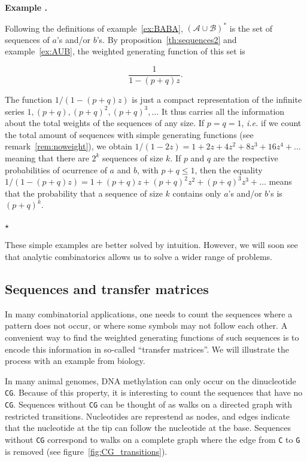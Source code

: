 \documentclass{article}
\newcounter{examplecounter}
\newenvironment{example}
{\small\vspace{0.5\baselineskip}
  \refstepcounter{examplecounter}%
  \noindent\textbf{Example \arabic{examplecounter}.}%
}{\vspace{-0.2\baselineskip}\begin{center}%
  $\star$\end{center}\vspace{0.5\baselineskip}}
\begin{document}
\begin{example}
\label{ex:AUB+}
Following the definitions of example~\ref{ex:BABA}, $(\mathcal{A} \cup
\mathcal{B})^*$ is the set of sequences of $a$'s and/or $b$'s. By
proposition~\ref{th:sequences2} and example~\ref{ex:AUB}, the weighted
generating function of this set is

\begin{equation*}
\frac{1}{1-(p+q)z}.
\end{equation*}

The function $1 / (1-(p+q)z)$ is just a compact representation of the
infinite series $1, (p+q), (p+q)^2, (p+q)^3, \ldots$ It thus carries all
the information about the total weights of the sequences of any size. If
$p = q = 1$, \textit{i.e.} if we count the total amount of sequences with
simple generating functions (see remark~\ref{rem:noweight}), we obtain
$1/(1-2z) = 1+ 2z + 4z^2 + 8z^3 + 16z^4 + \ldots$ meaning that there are
$2^k$ sequences of size $k$. If $p$ and $q$ are the respective
probabilities of ocurrence of $a$ and $b$, with $p + q \leq 1$, then the
equality $1 / (1-(p+q)z) = 1+ (p+q)z + (p+q)^2z^2 + (p+q)^3z^3 + \ldots$
means that the probability that a sequence of size $k$ contains only $a$'s
and/or $b$'s is $(p+q)^k$.
\end{example}

These simple examples are better solved by intuition. However, we will
soon see that analytic combinatorics allows us to solve a wider range of
problems.





\subsection{Sequences and transfer matrices}
\label{subsec:TransMat}

In many combinatorial applications, one needs to count the sequences where
a pattern does not occur, or where some symbols may not follow each other.
A convenient way to find the weighted generating functions of such
sequences is to encode this information in so-called ``transfer
matrices''. We will illustrate the process with an example from biology.

In many animal genomes, DNA methylation can only occur on the dinucleotide
\texttt{CG}. Because of this property, it is interesting to count the
sequences that have no \texttt{CG}. Sequences without \texttt{CG} can be
thought of as walks on a directed graph with restricted transitions.
Nucleotides are represtend as nodes, and edges indicate that the
nucleotide at the tip can follow the nucleotide at the base. Sequences
without \texttt{CG} correspond to walks on a complete graph where the edge
from \texttt{C} to \texttt{G} is removed (see
figure~\ref{fig:CG_transitions}).
\end{document}
